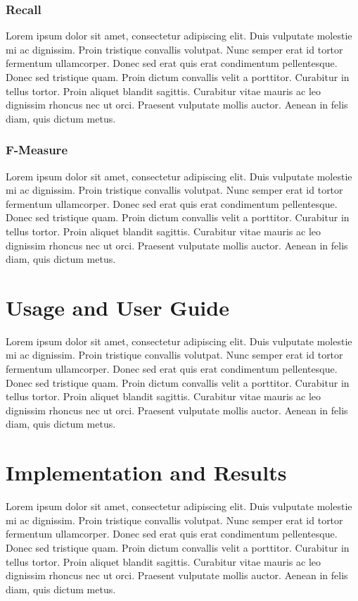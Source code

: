\documentclass[11pt]{article}
\begin{document}
\subsubsection{Recall}
Lorem ipsum dolor sit amet, consectetur adipiscing elit. Duis vulputate molestie mi ac dignissim. Proin tristique convallis volutpat. Nunc semper erat id tortor fermentum ullamcorper. Donec sed erat quis erat condimentum pellentesque. Donec sed tristique quam. Proin dictum convallis velit a porttitor. Curabitur in tellus tortor. Proin aliquet blandit sagittis. Curabitur vitae mauris ac leo dignissim rhoncus nec ut orci. Praesent vulputate mollis auctor. Aenean in felis diam, quis dictum metus.

\subsubsection{F-Measure}
Lorem ipsum dolor sit amet, consectetur adipiscing elit. Duis vulputate molestie mi ac dignissim. Proin tristique convallis volutpat. Nunc semper erat id tortor fermentum ullamcorper. Donec sed erat quis erat condimentum pellentesque. Donec sed tristique quam. Proin dictum convallis velit a porttitor. Curabitur in tellus tortor. Proin aliquet blandit sagittis. Curabitur vitae mauris ac leo dignissim rhoncus nec ut orci. Praesent vulputate mollis auctor. Aenean in felis diam, quis dictum metus.

\section{Usage and User Guide}
Lorem ipsum dolor sit amet, consectetur adipiscing elit. Duis vulputate molestie mi ac dignissim. Proin tristique convallis volutpat. Nunc semper erat id tortor fermentum ullamcorper. Donec sed erat quis erat condimentum pellentesque. Donec sed tristique quam. Proin dictum convallis velit a porttitor. Curabitur in tellus tortor. Proin aliquet blandit sagittis. Curabitur vitae mauris ac leo dignissim rhoncus nec ut orci. Praesent vulputate mollis auctor. Aenean in felis diam, quis dictum metus.

\section{Implementation and Results}
Lorem ipsum dolor sit amet, consectetur adipiscing elit. Duis vulputate molestie mi ac dignissim. Proin tristique convallis volutpat. Nunc semper erat id tortor fermentum ullamcorper. Donec sed erat quis erat condimentum pellentesque. Donec sed tristique quam. Proin dictum convallis velit a porttitor. Curabitur in tellus tortor. Proin aliquet blandit sagittis. Curabitur vitae mauris ac leo dignissim rhoncus nec ut orci. Praesent vulputate mollis auctor. Aenean in felis diam, quis dictum metus.
\end{document}
